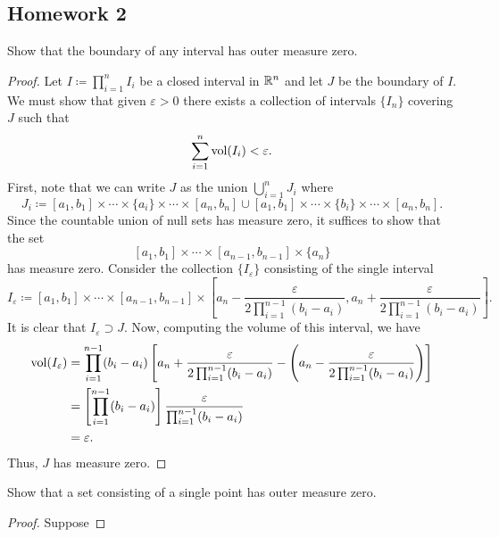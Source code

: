 \subsection{Homework 2}
\begin{problem}
  Show that the boundary of any interval has outer measure zero.
\end{problem}
\begin{proof}
  Let $I\coloneq\prod_{i=1}^n I_i$ be a closed interval in $\mathbb{R}^n$ and let
  $J$ be the boundary of $I$. We must show that given $\varepsilon>0$ there
  exists a collection of intervals $\{I_n\}$ covering $J$ such that
  \[
    \sum_{i=1}^n\operatorname{vol}(I_i)<\varepsilon.
  \]
  First, note that we can write $J$ as the union $\bigcup_{i=1}^n J_i$
  where
  \[
    J_i\coloneq%
      [a_1,b_1]\times\cdots\times\{a_i\}\times\cdots\times[a_n,b_n]%
    \cup
    [a_1,b_1]\times\cdots\times\{b_i\}\times\cdots\times[a_n,b_n].
  \]
  Since the countable union of null sets has measure zero, it suffices to
  show that the set
  \[
    [a_1,b_1]\times\cdots\times[a_{n-1},b_{n-1}]\times\{a_n\}%
  \]
  has measure zero. Consider the collection $\{I_\varepsilon\}$ consisting
  of the single interval
  \[
    I_\varepsilon\coloneq [a_1,b_1]\times\cdots\times[a_{n-1},b_{n-1}]
    \times\left[a_n-\frac{\varepsilon}{2\prod_{i=1}^{n-1}(b_i-a_i)},
      a_n+\frac{\varepsilon}{2\prod_{i=1}^{n-1}(b_i-a_i)}\right].
  \]
  It is clear that $I_\varepsilon\supset J$. Now, computing the volume of
  this interval, we have
  \begin{align*}
    \vol(I_\varepsilon)%
    &=\prod_{i=1}^{n-1}(b_i-a_i)%
    \left[%
    a_n+\frac{\varepsilon}{2\prod_{i=1}^{n-1}(b_i-a_i)}%
    -\left(%
    a_n -\frac{\varepsilon}{2\prod_{i=1}^{n-1}(b_i-a_i)} \right)
    \right]\\
    &=\left[\prod_{i=1}^{n-1}(b_i-a_i)\right]%
      \frac{\varepsilon}{\prod_{i=1}^{n-1}(b_i-a_i)}\\
    &=\varepsilon.
  \end{align*}
  Thus, $J$ has measure zero.
\end{proof}

\begin{problem}
  Show that a set consisting of a single point has outer measure zero.
\end{problem}
\begin{proof}
  Suppose
\end{proof}

